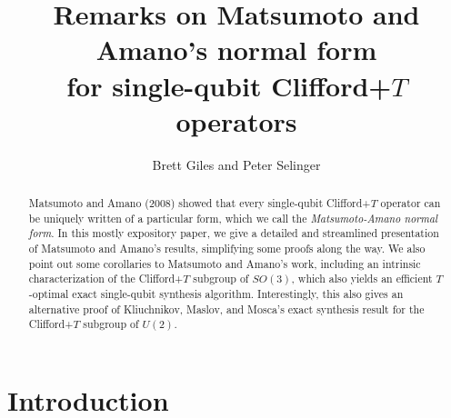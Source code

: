 \documentclass{article}
\title{Remarks on Matsumoto and Amano's normal form\\
  for single-qubit Clifford+$T$ operators}
\author{Brett Giles and Peter Selinger}
\date{}
\begin{document}
\maketitle

\begin{abstract}
  Matsumoto and Amano (2008) showed that every single-qubit
  Clifford+$T$ operator can be uniquely written of a particular form,
  which we call the {\em Matsumoto-Amano normal form}. In this mostly
  expository paper, we give a detailed and streamlined presentation of
  Matsumoto and Amano's results, simplifying some proofs along the
  way. We also point out some corollaries to Matsumoto and Amano's
  work, including an intrinsic characterization of the Clifford+$T$
  subgroup of $SO(3)$, which also yields an efficient $T$-optimal
  exact single-qubit synthesis algorithm. Interestingly, this also
  gives an alternative proof of Kliuchnikov, Maslov, and Mosca's
  exact synthesis result for the Clifford+$T$ subgroup of $U(2)$. 
\end{abstract}

\section{Introduction}
\end{document}
